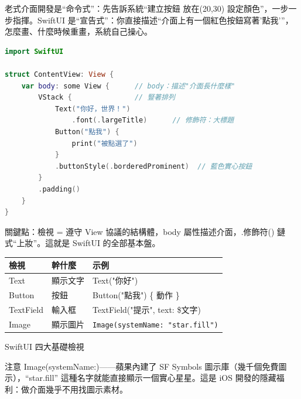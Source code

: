 


老式介面開發是“命令式”：先告訴系統“建立按鈕 放在(20,30) 設定顏色”，一步一步指揮。SwiftUI 是“宣告式”：你直接描述“介面上有一個紅色按鈕寫著'點我'”，怎麼畫、什麼時候重畫，系統自己操心。

\begin{lstlisting}[language=Swift]
import SwiftUI

struct ContentView: View {
    var body: some View {      // body：描述"介面長什麼樣"
        VStack {               // 豎著排列
            Text("你好，世界！")
                .font(.largeTitle)      // 修飾符：大標題
            Button("點我") {
                print("被點選了")
            }
            .buttonStyle(.borderedProminent)  // 藍色實心按鈕
        }
        .padding()
    }
}
\end{lstlisting}

關鍵點：檢視 = 遵守 View 協議的結構體，body 屬性描述介面，.修飾符() 鏈式“上妝”。這就是 SwiftUI 的全部基本盤。


\begin{center}
\begin{tabularx}{\linewidth}{|X|X|X|}
\hline
\textbf{檢視} & \textbf{幹什麼} & \textbf{示例} \tabularnewline
\hline
Text & 顯示文字 & Text("你好") \tabularnewline
Button & 按鈕 & Button("點我") \{ 動作 \} \tabularnewline
TextField & 輸入框 & TextField("提示", text: \$文字) \tabularnewline
Image & 顯示圖片 & \texttt{Image(systemName: "star.\allowbreak fill")} \tabularnewline
\hline
\end{tabularx}
\end{center}

\begin{center}\small\color{gray}SwiftUI 四大基礎檢視\end{center}

注意 Image(systemName:)——蘋果內建了 SF Symbols 圖示庫（幾千個免費圖示），“star.fill” 這種名字就能直接顯示一個實心星星。這是 iOS 開發的隱藏福利：做介面幾乎不用找圖示素材。


